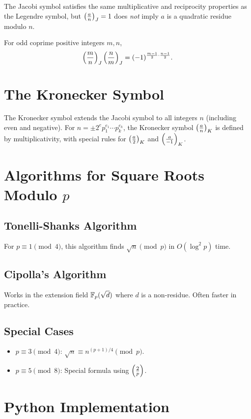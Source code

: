 The Jacobi symbol satisfies the same multiplicative and reciprocity properties as the Legendre symbol, but $\left(\frac{a}{n}\right)_J = 1$ does \textit{not} imply $a$ is a quadratic residue modulo $n$.

\begin{theorem}
For odd coprime positive integers $m, n$,
\[
\left(\frac{m}{n}\right)_J \left(\frac{n}{m}\right)_J = (-1)^{\frac{m-1}{2} \cdot \frac{n-1}{2}}.
\]
\end{theorem}

\section{The Kronecker Symbol}

The Kronecker symbol extends the Jacobi symbol to all integers $n$ (including even and negative). For $n = \pm 2^e p_1^{e_1} \cdots p_k^{e_k}$, the Kronecker symbol $\left(\frac{a}{n}\right)_K$ is defined by multiplicativity, with special rules for $\left(\frac{a}{2}\right)_K$ and $\left(\frac{a}{-1}\right)_K$.

\section{Algorithms for Square Roots Modulo $p$}

\subsection{Tonelli-Shanks Algorithm}
For $p \equiv 1 \pmod{4}$, this algorithm finds $\sqrt{n} \pmod{p}$ in $O(\log^2 p)$ time.

\subsection{Cipolla's Algorithm}
Works in the extension field $\mathbb{F}_p(\sqrt{d})$ where $d$ is a non-residue. Often faster in practice.

\subsection{Special Cases}
\begin{itemize}
    \item $p \equiv 3 \pmod{4}$: $\sqrt{n} \equiv n^{(p+1)/4} \pmod{p}$.
    \item $p \equiv 5 \pmod{8}$: Special formula using $\left(\frac{2}{p}\right)$.
\end{itemize}

\section{Python Implementation}
\label{sec:quadratic-python}

